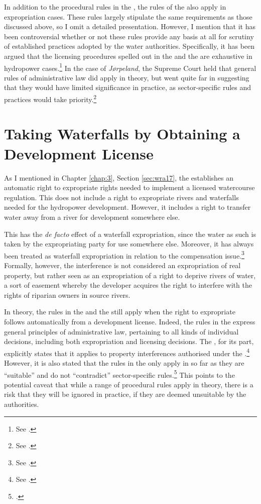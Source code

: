 In addition to the procedural rules in the \cite{ea59}, the rules of the \cite{paa67} also apply in expropriation cases. These rules largely stipulate the same requirements as those discussed above, so I omit a detailed presentation. However, I mention that it has been controversial whether or not these rules provide any basis at all for scrutiny of established practices adopted by the water authorities. Specifically, it has been argued that the licensing procedures spelled out in the \cite{wra00} and the \cite{wra17} are exhaustive in hydropower cases.\footnote{See \cite{jorpeland11a}.} In the case of {\it Jørpeland}, the Supreme Court held that general rules of administrative law did apply in theory, but went quite far in suggesting that they would have limited significance in practice, as sector-specific rules and practices would take priority.\footnote{See \cite{jorpeland11}.}

\section{Taking Waterfalls by Obtaining a Development License}\label{sec:5:3}

As I mentioned in Chapter \ref{chap:3}, Section \ref{sec:wra17}, the \cite{wra17} establishes an automatic right to expropriate rights needed to implement a licensed watercourse regulation. This does not include a right to expropriate rivers and waterfalls needed for the hydropower development. However, it includes a right to transfer water away from a river for development somewhere else.

This has the {\it de facto} effect of a waterfall expropriation, since the water as such is taken by the expropriating party for use somewhere else. Moreover, it has always been treated as waterfall expropriation in relation to the compensation issue.\footnote{See \cite{jorpeland11}.} Formally, however, the interference is not considered an expropriation of real property, but rather seen as an expropriation of a right to deprive rivers of water, a sort of easement whereby the developer acquires the right to interfere with the rights of riparian owners in source rivers.

In theory, the rules in the \cite{ea59} and the \cite{paa67} still apply when the right to expropriate follows automatically from a development license. Indeed, the rules in the \cite{paa67} express general principles of administrative law, pertaining to all kinds of individual decisions, including both expropriation and licensing decisions. The \cite{ea59}, for its part, explicitly states that it applies to property interferences authorised under the \cite{wra17}.\footnote{See \cite[30]{ea59}.} However, it is also stated that the rules in the \cite{ea59} only apply in so far as they are ``suitable'' and do not ``contradict'' sector-specific rules.\footcite[30]{ea59} This points to the potential caveat that while a range of procedural rules apply in theory, there is a risk that they will be ignored in practice, if they are deemed unsuitable by the authorities.


